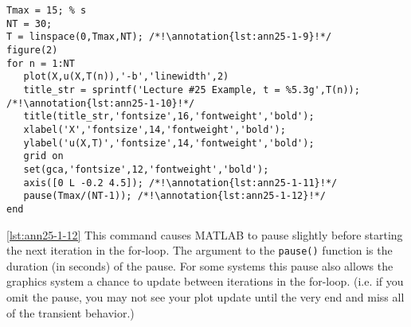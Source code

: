 \begin{lstlisting}[name=lec25-ex1, style=myMatlab]
%% Simple time-dependent plot 
Tmax = 15; % s
NT = 30;
T = linspace(0,Tmax,NT); /*!\annotation{lst:ann25-1-9}!*/
figure(2)
for n = 1:NT
   plot(X,u(X,T(n)),'-b','linewidth',2)
   title_str = sprintf('Lecture #25 Example, t = %5.3g',T(n)); /*!\annotation{lst:ann25-1-10}!*/
   title(title_str,'fontsize',16,'fontweight','bold');
   xlabel('X','fontsize',14,'fontweight','bold');
   ylabel('u(X,T)','fontsize',14,'fontweight','bold');
   grid on
   set(gca,'fontsize',12,'fontweight','bold');
   axis([0 L -0.2 4.5]); /*!\annotation{lst:ann25-1-11}!*/
   pause(Tmax/(NT-1)); /*!\annotation{lst:ann25-1-12}!*/
end
\end{lstlisting}

\vspace{0.15cm}

\ref{lst:ann25-1-12} This command causes MATLAB to pause slightly before starting the next iteration in the for-loop.  The argument to the \lstinline[style=myMatlab]{pause()} function is the duration (in seconds) of the pause.  For some systems this pause also allows the graphics system a chance to update between iterations in the for-loop.  (i.e. if you omit the pause, you may not see your plot update until the very end and miss all of the transient behavior.)

